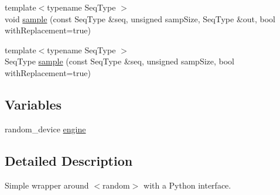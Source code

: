 \begin{DoxyCompactItemize}
\item 
{\footnotesize template$<$typename Seq\-Type $>$ }\\void \hyperlink{namespacepy__random_ab19bd560711e2208769bd09a80ea185f}{sample} (const Seq\-Type \&seq, unsigned samp\-Size, Seq\-Type \&out, bool with\-Replacement=true)
\item 
{\footnotesize template$<$typename Seq\-Type $>$ }\\Seq\-Type \hyperlink{namespacepy__random_a9db6806890355daad49822818b8c8378}{sample} (const Seq\-Type \&seq, unsigned samp\-Size, bool with\-Replacement=true)
\end{DoxyCompactItemize}
\subsection*{Variables}
\begin{DoxyCompactItemize}
\item 
random\-\_\-device \hyperlink{namespacepy__random_a1965c2cf853d039447d4c533e5d65293}{engine}
\end{DoxyCompactItemize}


\subsection{Detailed Description}
Simple wrapper around {\ttfamily $<$random$>$} with a Python interface. 

